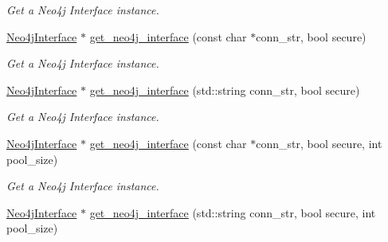 \begin{DoxyCompactItemize}
\begin{DoxyCompactList}\small\item\em Get a Neo4j Interface instance. \end{DoxyCompactList}\item 
\hyperlink{classNeo4jInterface}{Neo4j\+Interface} $\ast$ \hyperlink{classNeo4jComponentFactory_a39494cada942dc1192f73614f0286b74}{get\+\_\+neo4j\+\_\+interface} (const char $\ast$conn\+\_\+str, bool secure)\hypertarget{classNeo4jComponentFactory_a39494cada942dc1192f73614f0286b74}{}\label{classNeo4jComponentFactory_a39494cada942dc1192f73614f0286b74}

\begin{DoxyCompactList}\small\item\em Get a Neo4j Interface instance. \end{DoxyCompactList}\item 
\hyperlink{classNeo4jInterface}{Neo4j\+Interface} $\ast$ \hyperlink{classNeo4jComponentFactory_a05cde3179521c3ca1923857ab2df0b09}{get\+\_\+neo4j\+\_\+interface} (std\+::string conn\+\_\+str, bool secure)\hypertarget{classNeo4jComponentFactory_a05cde3179521c3ca1923857ab2df0b09}{}\label{classNeo4jComponentFactory_a05cde3179521c3ca1923857ab2df0b09}

\begin{DoxyCompactList}\small\item\em Get a Neo4j Interface instance. \end{DoxyCompactList}\item 
\hyperlink{classNeo4jInterface}{Neo4j\+Interface} $\ast$ \hyperlink{classNeo4jComponentFactory_a439b2ce6c377198e182debf6420d83f2}{get\+\_\+neo4j\+\_\+interface} (const char $\ast$conn\+\_\+str, bool secure, int pool\+\_\+size)\hypertarget{classNeo4jComponentFactory_a439b2ce6c377198e182debf6420d83f2}{}\label{classNeo4jComponentFactory_a439b2ce6c377198e182debf6420d83f2}

\begin{DoxyCompactList}\small\item\em Get a Neo4j Interface instance. \end{DoxyCompactList}\item 
\hyperlink{classNeo4jInterface}{Neo4j\+Interface} $\ast$ \hyperlink{classNeo4jComponentFactory_ac50d47ed9900cc0260964e2c269f7840}{get\+\_\+neo4j\+\_\+interface} (std\+::string conn\+\_\+str, bool secure, int pool\+\_\+size)\hypertarget{classNeo4jComponentFactory_ac50d47ed9900cc0260964e2c269f7840}{}\label{classNeo4jComponentFactory_ac50d47ed9900cc0260964e2c269f7840}


\end{DoxyCompactItemize}
